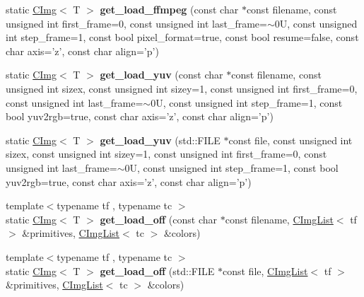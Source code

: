 \begin{DoxyCompactItemize}
\item 
\hypertarget{structcimg__library_1_1CImg_a4a9649dc62470fc906c5b0537c2854d0}{
static \hyperlink{structcimg__library_1_1CImg}{CImg}$<$ T $>$ {\bfseries get\_\-load\_\-ffmpeg} (const char $\ast$const filename, const unsigned int first\_\-frame=0, const unsigned int last\_\-frame=$\sim$0U, const unsigned int step\_\-frame=1, const bool pixel\_\-format=true, const bool resume=false, const char axis='z', const char align='p')}
\label{structcimg__library_1_1CImg_a4a9649dc62470fc906c5b0537c2854d0}

\item 
\hypertarget{structcimg__library_1_1CImg_a5737e6e4159a10973fdf275e08453c84}{
static \hyperlink{structcimg__library_1_1CImg}{CImg}$<$ T $>$ {\bfseries get\_\-load\_\-yuv} (const char $\ast$const filename, const unsigned int sizex, const unsigned int sizey=1, const unsigned int first\_\-frame=0, const unsigned int last\_\-frame=$\sim$0U, const unsigned int step\_\-frame=1, const bool yuv2rgb=true, const char axis='z', const char align='p')}
\label{structcimg__library_1_1CImg_a5737e6e4159a10973fdf275e08453c84}

\item 
\hypertarget{structcimg__library_1_1CImg_a85af20d2722db3299646537fbf64680f}{
static \hyperlink{structcimg__library_1_1CImg}{CImg}$<$ T $>$ {\bfseries get\_\-load\_\-yuv} (std::FILE $\ast$const file, const unsigned int sizex, const unsigned int sizey=1, const unsigned int first\_\-frame=0, const unsigned int last\_\-frame=$\sim$0U, const unsigned int step\_\-frame=1, const bool yuv2rgb=true, const char axis='z', const char align='p')}
\label{structcimg__library_1_1CImg_a85af20d2722db3299646537fbf64680f}

\item 
\hypertarget{structcimg__library_1_1CImg_a169bf02841ab1af58d0371af35813594}{
{\footnotesize template$<$typename tf , typename tc $>$ }\\static \hyperlink{structcimg__library_1_1CImg}{CImg}$<$ T $>$ {\bfseries get\_\-load\_\-off} (const char $\ast$const filename, \hyperlink{structcimg__library_1_1CImgList}{CImgList}$<$ tf $>$ \&primitives, \hyperlink{structcimg__library_1_1CImgList}{CImgList}$<$ tc $>$ \&colors)}
\label{structcimg__library_1_1CImg_a169bf02841ab1af58d0371af35813594}

\item 
\hypertarget{structcimg__library_1_1CImg_ad776dfb8e442f338a2cbcf488902f2e0}{
{\footnotesize template$<$typename tf , typename tc $>$ }\\static \hyperlink{structcimg__library_1_1CImg}{CImg}$<$ T $>$ {\bfseries get\_\-load\_\-off} (std::FILE $\ast$const file, \hyperlink{structcimg__library_1_1CImgList}{CImgList}$<$ tf $>$ \&primitives, \hyperlink{structcimg__library_1_1CImgList}{CImgList}$<$ tc $>$ \&colors)}
\label{structcimg__library_1_1CImg_ad776dfb8e442f338a2cbcf488902f2e0}


\end{DoxyCompactItemize}
